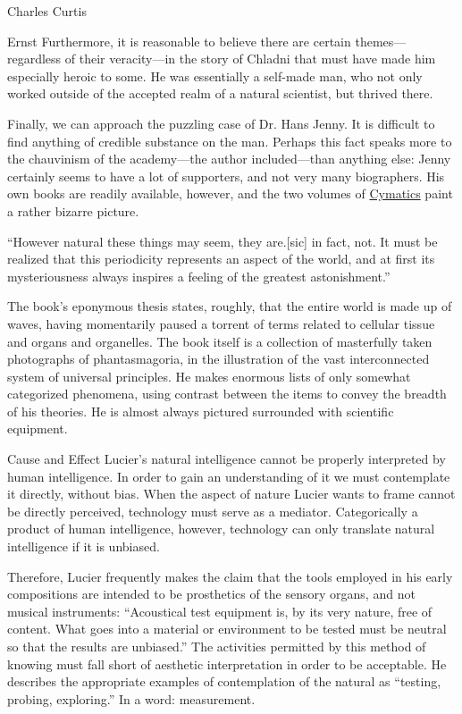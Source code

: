 \documentclass[a4paper,10pt]{report}
\numberwithin{equation}{section}
\begin{document}
\begin{chapter}{Charles Curtis}
\begin{section}{Ernst}
Furthermore, it is reasonable to believe there are certain themes---regardless of their veracity---in the story of Chladni that must have made him especially heroic to some. He was essentially a self-made man, who not only worked outside of the accepted realm of a natural scientist, but thrived there. 

Finally, we can approach the puzzling case of Dr. Hans Jenny. It is difficult to find anything of credible substance on the man. Perhaps this fact speaks more to the chauvinism of the academy---the author included---than anything else: Jenny certainly seems to have a lot of supporters, and not very many biographers. His own books are readily available, however, and the two volumes of \underline{Cymatics} paint a rather bizarre picture.

``However natural these things may seem, they are.[sic] in fact,
 not. It must be realized that this periodicity represents an aspect of the world, and at first its mysteriousness always inspires a feeling of the greatest astonishment.'' \cite[p.~16]{Jenny2001}

The book's eponymous thesis states, roughly, that the entire world is made up of waves, having momentarily paused a torrent of terms related to cellular tissue and organs and organelles. The book itself is a collection of masterfully taken photographs of phantasmagoria, in the illustration of the vast interconnected system of universal principles. He makes enormous lists of only somewhat categorized phenomena, using contrast between the items to convey the breadth of his theories. He is almost always pictured surrounded with scientific equipment. 
\end{section}
\begin{section}{Cause and Effect}
 Lucier's natural intelligence cannot be properly interpreted by human intelligence. In order to gain an understanding of it we must contemplate it directly, without bias. When the aspect of nature Lucier wants to frame cannot be directly perceived, technology must serve as a mediator. Categorically a product of human intelligence, however, technology can only translate natural intelligence if it is unbiased. 

Therefore, Lucier frequently makes the claim that the tools employed in his early compositions are intended to be prosthetics of the sensory organs, and not musical instruments: ``Acoustical test equipment is, by its very nature, free of content. What goes into a material or environment to be tested must be neutral so that the results are unbiased.''\cite[p.~456]{lucier1995} The activities permitted by this method of knowing must fall short of aesthetic interpretation in order to be acceptable. He describes the appropriate examples of contemplation of the natural as ``testing, probing, exploring.''\cite[p.~440]{lucier1995} In a word: measurement.


\end{section}
\end{chapter}
\end{document}
